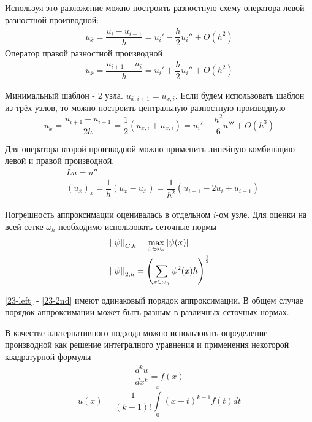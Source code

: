 Используя это разложение можно построить разностную схему оператора левой разностной
производной:
\begin{align}
  \label{23-left}
  u_{\overline{x}} = \dfrac{u_i - u_{i - 1}}{h} = u_i' - \dfrac{h}{2}u_i'' + O(h^2)
\end{align}
Оператор правой разностной производной
\begin{align}
  \label{23-right}
  u_{\overline{x}} = \dfrac{u_{i + 1} - u_i}{h} = u_i' + \dfrac{h}{2}u_i'' + O(h^2)
\end{align}

Минимальный шаблон - 2 узла. $u_{\overline{x}, i + 1} = u_{x, i}$. Если будем
использовать шаблон из трёх узлов, то можно построить центральную разностную
производную
\begin{equation}
  \label{23-center}
  u_{\mathring{x}} = \dfrac{u_{i + 1} - u_{i - 1}}{2h} = \dfrac{1}{2}
  (u_{\overline{x}, i} + u_{x, i}) = u_i' + \dfrac{h^2}{6}u''' + O(h^3)
\end{equation}

Для оператора второй производной можно применить линейную комбинацию левой и правой
производной.
\begin{align}
  \label{23-2nd}
  &\nonumber Lu = u''\\
  &(u_{\overline{x}})_x = \dfrac{1}{h}(u_x - u_{\overline{x}}) = \dfrac{1}{h^2}
  (u_{i + 1} - 2u_i + u_{i - 1})
\end{align}

Погрешность аппроксимации оценивалась в отдельном $i$-ом узле. Для оценки на всей
сетке $\omega_h$ необходимо использовать сеточные нормы
\begin{equation}
  \begin{split}
    &\left\lvert \left\lvert \psi \right\rvert \right\rvert_{C,h} = \underset{x \in \omega_h}\max\left\lvert \psi(x) \right\rvert\\
    &\left\lvert \left\lvert \psi \right\rvert \right\rvert_{2, h} = \left(\sum\limits_{x \in \omega_h}
    \psi^2(x)h\right)^{\frac{1}{2}}
  \end{split}
\end{equation}

\eqref{23-left} - \eqref{23-2nd} имеют одинаковый порядок аппроксимации. В общем
случае порядок аппроксимации может быть разным в различных сеточных нормах.

В качестве альтернативного подхода можно использовать определение производной как
решение интегралного уравнения и применения некоторой квадратурной формулы
\begin{align*}
  \dfrac{d^ku}{dx^k} = f(x)
\end{align*}
\begin{equation}
  \label{23-le}
  u(x) = \dfrac{1}{(k - 1)!}\int\limits_0^x(x - t)^{k - 1}f(t)dt
\end{equation}

